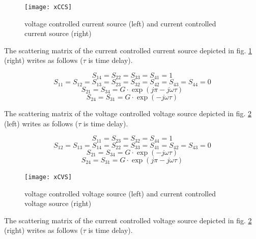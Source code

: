 \documentclass[10pt]{report}
\begin{document}
\begin{figure}[ht]
\begin{center}
\texttt{[image: xCCS]}
\end{center}
\caption{voltage controlled current source (left) and current controlled current source (right)}
\label{fig:xCCS}
\end{figure}
\FloatBarrier

The scattering matrix of the current controlled current source
depicted in fig. \ref{fig:xCCS} (right) writes as follows ($\tau$ is
time delay).

\begin{equation}
S_{14} = S_{22} = S_{33} = S_{41} = 1
\end{equation}
\begin{equation}
S_{11} = S_{12} = S_{13} = S_{23} = S_{32} = S_{42} = S_{43} = S_{44} = 0
\end{equation}
\begin{equation}
S_{21} = S_{34} = G\cdot \exp(j\pi-j\omega\tau)
\end{equation}
\begin{equation}
S_{24} = S_{31} = G\cdot \exp(-j\omega\tau)
\end{equation}

The scattering matrix of the voltage controlled voltage source
depicted in fig. \ref{fig:xCVS} (left) writes as follows ($\tau$ is
time delay).

\begin{equation}
S_{11} = S_{23} = S_{32} = S_{44} = 1
\end{equation}
\begin{equation}
S_{12} = S_{13} = S_{14} = S_{22} = S_{33} = S_{41} = S_{42} = S_{43} = 0
\end{equation}
\begin{equation}
S_{21} = S_{34} = G\cdot \exp(-j\omega\tau)
\end{equation}
\begin{equation}
S_{24} = S_{31} = G\cdot \exp(j\pi-j\omega\tau)
\end{equation}

\begin{figure}[ht]
\begin{center}
\texttt{[image: xCVS]}
\end{center}
\caption{voltage controlled voltage source (left) and current controlled voltage source (right)}
\label{fig:xCVS}
\end{figure}
\FloatBarrier

The scattering matrix of the current controlled voltage source
depicted in fig. \ref{fig:xCVS} (right) writes as follows ($\tau$ is
time delay).
\end{document}
